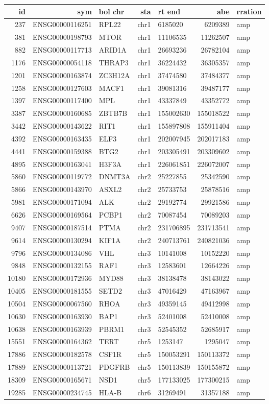 \documentclass[]{article}
\begin{document}
\begin{longtable}[]{@{}rrlrlrl@{}}
\toprule
id & sym & bol chr & sta & rt end & abe & rration\tabularnewline
\midrule
\endhead
237 & ENSG00000116251 & RPL22 & chr1 & 6185020 & 6209389 &
amp\tabularnewline
381 & ENSG00000198793 & MTOR & chr1 & 11106535 & 11262507 &
amp\tabularnewline
882 & ENSG00000117713 & ARID1A & chr1 & 26693236 & 26782104 &
amp\tabularnewline
1176 & ENSG00000054118 & THRAP3 & chr1 & 36224432 & 36305357 &
amp\tabularnewline
1201 & ENSG00000163874 & ZC3H12A & chr1 & 37474580 & 37484377 &
amp\tabularnewline
1258 & ENSG00000127603 & MACF1 & chr1 & 39081316 & 39487177 &
amp\tabularnewline
1397 & ENSG00000117400 & MPL & chr1 & 43337849 & 43352772 &
amp\tabularnewline
3387 & ENSG00000160685 & ZBTB7B & chr1 & 155002630 & 155018522 &
amp\tabularnewline
3442 & ENSG00000143622 & RIT1 & chr1 & 155897808 & 155911404 &
amp\tabularnewline
4392 & ENSG00000163435 & ELF3 & chr1 & 202007945 & 202017183 &
amp\tabularnewline
4441 & ENSG00000159388 & BTG2 & chr1 & 203305491 & 203309602 &
amp\tabularnewline
4895 & ENSG00000163041 & H3F3A & chr1 & 226061851 & 226072007 &
amp\tabularnewline
5860 & ENSG00000119772 & DNMT3A & chr2 & 25227855 & 25342590 &
amp\tabularnewline
5866 & ENSG00000143970 & ASXL2 & chr2 & 25733753 & 25878516 &
amp\tabularnewline
5981 & ENSG00000171094 & ALK & chr2 & 29192774 & 29921586 &
amp\tabularnewline
6626 & ENSG00000169564 & PCBP1 & chr2 & 70087454 & 70089203 &
amp\tabularnewline
9407 & ENSG00000187514 & PTMA & chr2 & 231706895 & 231713541 &
amp\tabularnewline
9614 & ENSG00000130294 & KIF1A & chr2 & 240713761 & 240821036 &
amp\tabularnewline
9796 & ENSG00000134086 & VHL & chr3 & 10141008 & 10152220 &
amp\tabularnewline
9848 & ENSG00000132155 & RAF1 & chr3 & 12583601 & 12664226 &
amp\tabularnewline
10180 & ENSG00000172936 & MYD88 & chr3 & 38138478 & 38143022 &
amp\tabularnewline
10405 & ENSG00000181555 & SETD2 & chr3 & 47016429 & 47163967 &
amp\tabularnewline
10504 & ENSG00000067560 & RHOA & chr3 & 49359145 & 49412998 &
amp\tabularnewline
10630 & ENSG00000163930 & BAP1 & chr3 & 52401008 & 52410008 &
amp\tabularnewline
10638 & ENSG00000163939 & PBRM1 & chr3 & 52545352 & 52685917 &
amp\tabularnewline
15551 & ENSG00000164362 & TERT & chr5 & 1253147 & 1295047 &
amp\tabularnewline
17886 & ENSG00000182578 & CSF1R & chr5 & 150053291 & 150113372 &
amp\tabularnewline
17889 & ENSG00000113721 & PDGFRB & chr5 & 150113839 & 150155872 &
amp\tabularnewline
18309 & ENSG00000165671 & NSD1 & chr5 & 177133025 & 177300215 &
amp\tabularnewline
19285 & ENSG00000234745 & HLA-B & chr6 & 31269491 & 31357188 &
amp\tabularnewline

\end{longtable}
\end{document}
